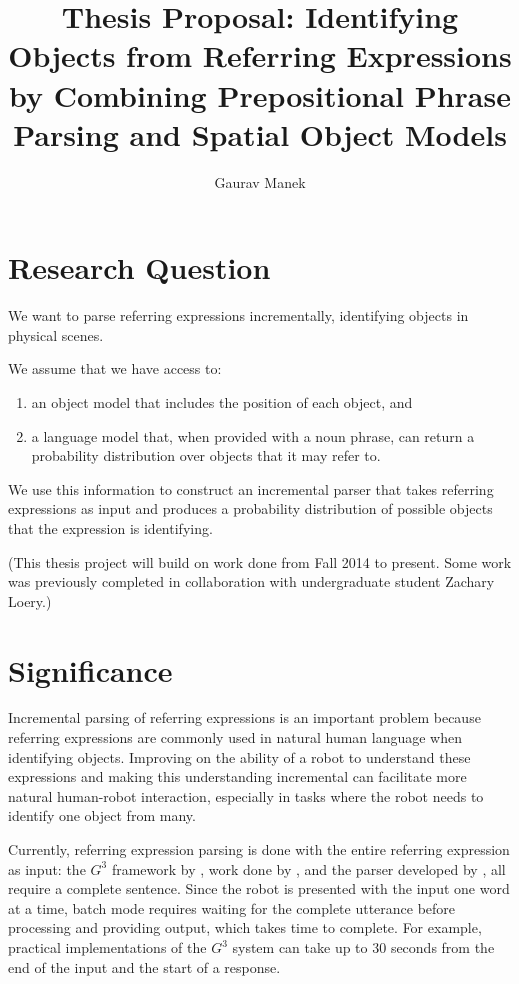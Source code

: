 \documentclass[letterpaper,10pt]{article}
\title{Thesis Proposal: Identifying Objects from Referring Expressions by Combining Prepositional Phrase Parsing and Spatial Object Models}
\author{Gaurav Manek}
\begin{document}
\maketitle


\section{Research Question}

We want to parse referring expressions incrementally,  identifying objects in physical scenes.

We assume that we have access to:
\begin{enumerate}[topsep=0pt,itemsep=-1ex,partopsep=1ex,parsep=1ex]
 \item an object model that includes the position of each object, and
 \item a language model that, when provided with a noun phrase, can return a probability distribution over objects that it may refer to.
\end{enumerate}

We use this information to construct an incremental parser that takes referring expressions as input and produces a probability distribution of possible objects that the expression is identifying.

(This thesis project will build on work done from Fall 2014 to present. Some work was previously completed in collaboration with undergraduate student Zachary Loery.)

\section{Significance}

Incremental parsing of referring expressions is an important problem because referring expressions are commonly used in natural human language when identifying objects. Improving on the ability of a robot to understand these expressions and making this understanding incremental can facilitate more natural human-robot interaction, especially in tasks where the robot needs to identify one object from many.

Currently, referring expression parsing is done with the entire referring expression as input: the $G^3$ framework by \citet{tellex2011understanding}, work done by \citet{UW_RSE_ICML2012}, and the parser developed by \citet{artzi2013weakly}, all require a complete sentence. Since the robot is presented with the input one word at a time, batch mode requires waiting for the complete utterance before processing and providing output, which takes time to complete. For example, practical implementations of the $G^3$ system can take up to 30 seconds from the end of the input and the start of a response. 
\end{document}
